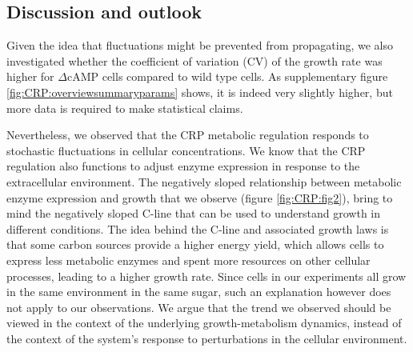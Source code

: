 \subsection{Discussion and outlook}

Given the idea that fluctuations might be prevented from propagating, 
we also investigated whether the coefficient of variation (CV) of the growth rate was higher for $\Delta$cAMP cells compared to wild type cells.
%
As supplementary figure \ref{fig:CRP:overviewsummaryparams} shows, it is indeed very slightly higher, but more data is required to make statistical claims.




Nevertheless, we observed that the CRP metabolic regulation responds to stochastic fluctuations in cellular concentrations.
%
%
We know that the CRP regulation also functions to adjust enzyme expression in response to 
the extracellular environment. 
%
The negatively sloped relationship between metabolic enzyme expression and growth that we observe (figure \ref{fig:CRP:fig2}), 
bring to mind the negatively sloped 
C-line \cite{You2013} that can be used to understand 
growth in different conditions. 
%
The idea behind the C-line and associated growth laws is that some carbon sources provide a higher energy yield, which allows cells to express less metabolic enzymes and spent more resources on other cellular processes, leading to a higher growth rate.
%
Since cells in our experiments all grow in the same environment in the same sugar, such an explanation however does not apply to our observations.
%
We argue that the trend we observed should be viewed in the context of the underlying growth-metabolism dynamics,
instead of the context of the system's response to perturbations in the cellular environment.
%
